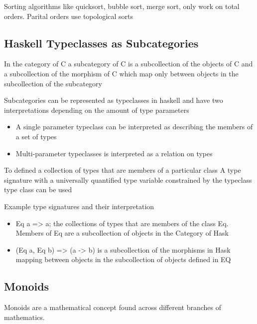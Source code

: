 \documentclass[12pt, letterpaper]{article}
\begin{document}
Sorting algorithms like quicksort, bubble sort, merge sort, only work on total orders. Parital orders use topological sorts

\subsection {Haskell Typeclasses as Subcategories}


In the category of C a subcategory of C is a subcollection of the objects of C and a subcollection of the morphism of C which map only between objects in the subcollection of the subcategory

Subcategories can be represented as typeclasses in haskell and have two interpretations depending on the amount of type parameters 

\begin{itemize}
  \item A single parameter typeclass can be interpreted as describing the members of a set of types
  \item Multi-parameter typeclasses is interpreted as a relation on types
\end{itemize}

To defined a collection of types that are members of a particular class A type signature with a universally quantified type variable constrained by the typeclass type class can be used

Example type signatures and their interpretation

\begin{itemize}
  \item Eq a => a; the collections of types that are members of the class Eq. Members of Eq are a subcollection of objects in the Category of Hask
  \item (Eq a, Eq b) => (a -> b) is a subcollection of the morphisms in Hask mapping between objects in the subcollection of objects defined in EQ 
\end{itemize}

\subsection{Monoids}

Monoids are a mathematical concept found across different branches of mathematics.
\end{document}
